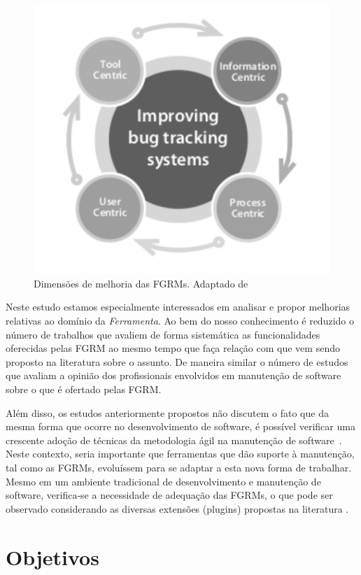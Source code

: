 \begin{figure}[htpb] \centering
	\includegraphics[width=0.666666\linewidth]
	{chapter-intro/img/dimensoes_melhorias_fgrm.pdf}
	\caption{Dimensões de melhoria das FGRMs. Adaptado
		de~\cite{zimmermann2005mining}}\label{fig:dimensoes_melhorias_fgrm}
\end{figure}

Neste estudo estamos especialmente interessados em analisar e propor melhorias
relativas ao domínio da \textit{Ferramenta}. Ao bem do nosso conhecimento é
reduzido o número de trabalhos que avaliem de forma sistemática as
funcionalidades oferecidas pelas FGRM ao mesmo tempo que faça relação com que
vem sendo proposto na li\-te\-ra\-tu\-ra sobre o assunto. De maneira similar o
número de estudos que avaliam a opinião dos profissionais envolvidos em
manutenção de software sobre o que é ofertado pelas FGRM\@.

Além disso, os estudos anteriormente propostos não discutem o fato que da mesma
forma que ocorre no desenvolvimento de software, é possível verificar uma
crescente adoção de técnicas da metodologia ágil na manutenção de
software~\cite{Soltan2016,Devulapally2015, Heeager2015}. Neste contexto, seria
importante que ferramentas que dão suporte à manutenção, tal como as FGRMs,
evoluíssem para se adaptar a esta nova forma de trabalhar. Mesmo em um
ambiente tradicional de  desenvolvimento e manutenção de software, verifica-se a
necessidade de adequação das FGRMs, o que pode ser observado considerando as
diversas extensões (plugins) propostas na literatura
\cite{101186,Thung:2014:BIT:2635868.2661678,Kononenko:2014:DED:2591062.2591075}.

\section{Objetivos}
\label{sec:intro-objetivos}

